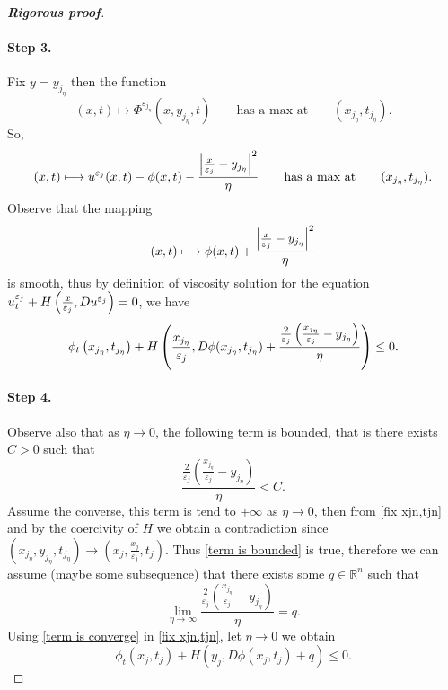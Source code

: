 \documentclass[12pt, oneside]{amsart}  	%
\begin{document}
\begin{proof}[\textbf{Rigorous proof}]
\paragraph{\textbf{Step 3.}} Fix $y=y_{j_\eta}$ then the function 
\begin{equation*}
(x,t)\mapsto \Phi^{\varepsilon_{j_\eta}}\left(x, y_{j_\eta}, t\right)\qquad\text{has a max at}\qquad \left(x_{j_\eta}, t_{j_\eta}\right).
\end{equation*}
So, 
\begin{equation*}
(x,t)\longmapsto u^{\varepsilon_j}(x,t) - \phi(x,t) - \frac{\left|\frac{x}{\varepsilon_j} - y_{j_\eta}\right|^2}{\eta}\qquad \text{has a max at}\qquad (x_{j_\eta}, t_{j_\eta}).
\end{equation*}
Observe that the mapping
\begin{equation*}
(x,t)\longmapsto  \phi(x,t) + \frac{\left|\frac{x}{\varepsilon_j} - y_{j_\eta}\right|^2}{\eta}
\end{equation*}
is smooth, thus by definition of viscosity solution for the equation $u^{\varepsilon_j}_t + H\left(\frac{x}{\varepsilon_j}, Du^{\varepsilon_j}\right)=0$, we have
\begin{equation}\label{fix xjn,tjn}
\phi_t\left(x_{j_\eta}, t_{j_\eta}\right)+ H\left(\frac{x_{j_\eta}}{\varepsilon_j}, D\phi(x_{j_\eta}, t_{j_\eta})+ \frac{\frac{2}{\varepsilon_j}\left(\frac{x_{j_\eta}}{\varepsilon_j} - y_{j_\eta}\right)}{\eta}\right)\le 0.
\end{equation}
\vspace*{0.2cm}


\paragraph{\textbf{Step 4.}} Observe also that as $\eta \longrightarrow 0$, the following term is bounded, that is there exists $C>0$ such that
\begin{equation}\label{term is bounded}
\frac{\frac{2}{\varepsilon_j} \left( \frac{x_{j_\eta}}{\varepsilon_j} - y_{j_\eta} \right)}{\eta} < C.
\end{equation}
Assume the converse, this term is tend to $+\infty$ as $\eta\longrightarrow 0$, then from \eqref{fix xjn,tjn} and by the coercivity of $H$ we obtain a contradiction since $(x_{j_\eta},y_{j_\eta},t_{j_\eta}) \longrightarrow \left(x_j,\frac{x_j}{\varepsilon_j},t_j\right)$. Thus \eqref{term is bounded} is true, therefore we can assume (maybe some subsequence) that there exists some $q\in \mathbb{R}^n$ such that
\begin{equation}\label{term is converge}
\lim_{\eta\longrightarrow\infty}\frac{\frac{2}{\varepsilon_j} \left( \frac{x_{j_\eta}}{\varepsilon_j} - y_{j_\eta} \right)}{\eta} =q.
\end{equation}
Using \eqref{term is converge} in \eqref{fix xjn,tjn}, let $\eta\longrightarrow0$ we obtain
\begin{equation}\label{first-equation}
\phi_t(x_j,t_j) + H\left(y_j, D\phi\left(x_j,t_j\right) + q\right) \leq 0.
\end{equation}
\vspace*{0.2cm}






\end{proof}
\end{document}
